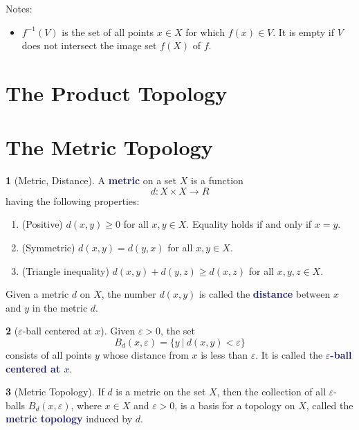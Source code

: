 \documentclass[12pt]{article}
\newcommand{\navy}[1]{\textcolor{MidnightBlue}{\bf #1}}
\theoremstyle{plain}
\theoremstyle{definition}
\newtheorem{definition}{\color{MidnightBlue}{\textbf{Definition}}}[section]
\newcommand{\1}{\mathbbm 1}
\newcommand{\e}{\varepsilon}
\begin{document}
Notes:
\begin{itemize}
	\item $f^{-1}(V)$ is the set of all points $x \in X$ for which $f(x) \in V$. It is empty if $V$ does not intersect the image set $f(X)$ of $f$.
\end{itemize}

\section{The Product Topology}

\section{The Metric Topology}

\begin{definition}[Metric, Distance]
	A \navy{metric} on a set $X$ is a function
	\begin{equation}
		d : X \times X \to R
	\end{equation}
	having the following properties:
	\begin{enumerate}
		\item (Positive) $d(x,y) \geq 0$ for all $x,y \in X$. Equality holds if and only if $x=y$.
		\item (Symmetric) $d(x,y) = d(y,x)$ for all $x,y \in X$.
		\item (Triangle inequality) $d(x,y) + d(y,z) \geq d(x,z)$ for all $x,y,z \in X$.
	\end{enumerate}
	Given a metric $d$ on $X$, the number $d(x,y)$ is called the \navy{distance} between $x$ and $y$ in the metric $d$.
\end{definition}

\begin{definition}[$\e$-ball centered at $x$]
	Given $\e > 0$, the set
	\begin{equation}
		B_d(x,\e) = \{y \ | \ d(x,y) < \e \}
	\end{equation}
	consists of all points $y$ whose distance from $x$ is less than $\e$. It is called the \navy{$\e$-ball centered at $x$}. 
\end{definition}

\begin{definition}[Metric Topology]
	If $d$ is a metric on the set $X$, then the collection of all $\e$-balls $B_d(x,\e)$, where $x \in X$ and $\e > 0$, is a basis for a topology on $X$, called the \navy{metric topology} induced by $d$.
\end{definition}
\end{document}
